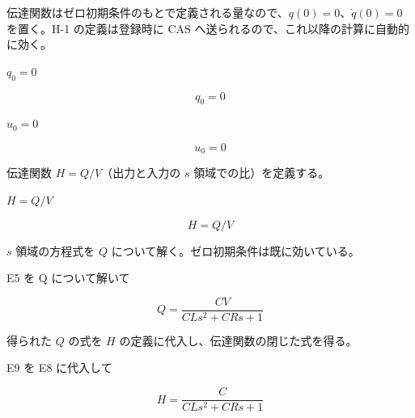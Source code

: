 \documentclass[dvipdfmx,a4paper,11pt]{jsarticle}
\begin{document}
伝達関数はゼロ初期条件のもとで定義される量なので、$q(0)=0$、$\dot q(0)=0$ を置く。H-1 の定義は登録時に CAS へ送られるので、これ以降の計算に自動的に効く。

$q_0 = 0$

\begin{equation}
  q_0 = 0
  \label{eq:E6}
\end{equation}

$u_0 = 0$

\begin{equation}
  u_0 = 0
  \label{eq:E7}
\end{equation}

伝達関数 $H=Q/V$（出力と入力の $s$ 領域での比）を定義する。

$H = Q/V$

\begin{equation}
  H = Q/V
  \label{eq:E8}
\end{equation}

$s$ 領域の方程式を $Q$ について解く。ゼロ初期条件は既に効いている。

E5 を Q について解いて

\begin{equation}
  Q = \frac{C V}{C L s^2+C R s+1}
  \label{eq:E9}
\end{equation}

得られた $Q$ の式を $H$ の定義に代入し、伝達関数の閉じた式を得る。

E9 を E8 に代入して

\begin{equation}
  H = \frac{C}{C L s^2+C R s+1}
  \label{eq:E10}
\end{equation}
\end{document}
